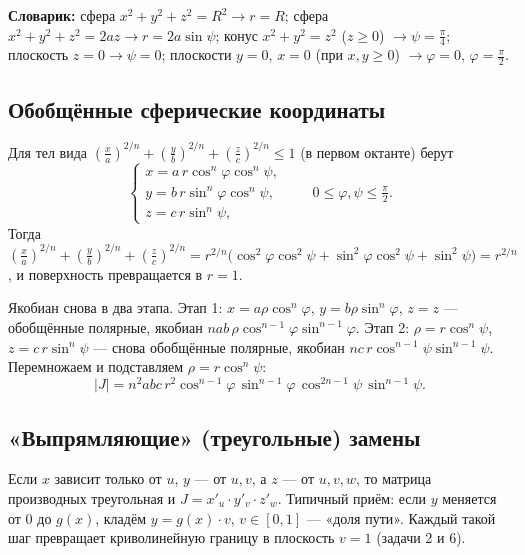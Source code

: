 \textbf{Словарик:} сфера $x^2+y^2+z^2=R^2\to r=R$; сфера $x^2+y^2+z^2=2az\to r=2a\sin\psi$; конус $x^2+y^2=z^2$ ($z\geqslant0$) $\to\psi=\frac\pi4$; плоскость $z=0\to\psi=0$; плоскости $y=0$, $x=0$ (при $x,y\geqslant0$) $\to\varphi=0$, $\varphi=\frac\pi2$.

\subsection{Обобщённые сферические координаты}
Для тел вида $\left(\frac xa\right)^{2/n}+\left(\frac yb\right)^{2/n}+\left(\frac zc\right)^{2/n}\leqslant1$ (в первом октанте) берут
\[
\begin{cases}x=a\,r\cos^n\varphi\cos^n\psi,\\ y=b\,r\sin^n\varphi\cos^n\psi,\\ z=c\,r\sin^n\psi,\end{cases}\qquad 0\leqslant\varphi,\psi\leqslant\tfrac\pi2 .
\]
Тогда $\left(\frac xa\right)^{2/n}+\left(\frac yb\right)^{2/n}+\left(\frac zc\right)^{2/n}=r^{2/n}\bigl(\cos^2\varphi\cos^2\psi+\sin^2\varphi\cos^2\psi+\sin^2\psi\bigr)=r^{2/n}$, и поверхность превращается в $r=1$.

Якобиан снова в два этапа. Этап 1: $x=a\rho\cos^n\varphi$, $y=b\rho\sin^n\varphi$, $z=z$ --- обобщённые полярные, якобиан $nab\,\rho\cos^{n-1}\varphi\sin^{n-1}\varphi$. Этап 2: $\rho=r\cos^n\psi$, $z=c\,r\sin^n\psi$ --- снова обобщённые полярные, якобиан $nc\,r\cos^{n-1}\psi\sin^{n-1}\psi$. Перемножаем и подставляем $\rho=r\cos^n\psi$:
\[
\boxed{\ |J|=n^2abc\,r^2\cos^{n-1}\varphi\,\sin^{n-1}\varphi\,\cos^{2n-1}\psi\,\sin^{n-1}\psi .\ }
\]

\subsection{«Выпрямляющие» (треугольные) замены}
Если $x$ зависит только от $u$, $y$ --- от $u,v$, а $z$ --- от $u,v,w$, то матрица производных треугольная и
$J=x'_u\cdot y'_v\cdot z'_w$. Типичный приём: если $y$ меняется от $0$ до $g(x)$, кладём $y=g(x)\cdot v$, $v\in[0,1]$ --- «доля пути». Каждый такой шаг превращает криволинейную границу в плоскость $v=1$ (задачи 2 и 6).

